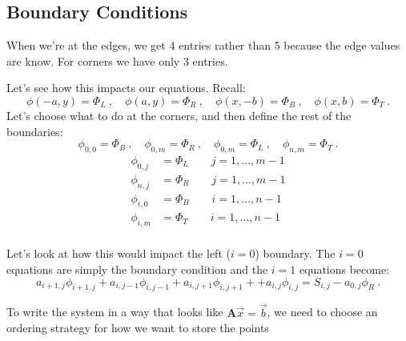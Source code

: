 \documentclass[12pt]{article}
\newcommand{\ve}[1]{\ensuremath{\mathbf{#1}}}
\begin{document}
\subsection{Boundary Conditions}

When we're at the edges, we get 4 entries rather than 5 because the edge values are know. For corners we have only 3 entries. 

Let's see how this impacts our equations. Recall:
%
\[\phi(-a,y) = \Phi_L\:, \quad \phi(a,y) = \Phi_R\:, \quad \phi(x,-b) = \Phi_B\:, \quad \phi(x,b) = \Phi_T\:.\]
%
Let's choose what to do at the corners, and then define the rest of the boundaries:
\[\phi_{0,0} = \Phi_B\:, \quad \phi_{0,m} = \Phi_R\:, \quad \phi_{0,m} = \Phi_L\:, \quad \phi_{n,m} = \Phi_T\:.\]
%
\begin{align}
\phi_{0,j} &= \Phi_L \qquad j=1,\dots,m-1 \nonumber \\
\phi_{n,j} &= \Phi_R \qquad j=1,\dots,m-1 \nonumber \\
\phi_{i,0} &= \Phi_B \qquad i=1,\dots,n-1 \nonumber \\
\phi_{i,m} &= \Phi_T \qquad i=1,\dots,n-1 \nonumber \\
\end{align}

Let's look at how this would impact the left ($i=0$) boundary. The $i=0$ equations are simply the boundary condition and the $i=1$ equations become:
\[a_{i+1,j}\phi_{i+1,j} + a_{i,j-1}\phi_{i,j-1} + a_{i,j+1}\phi_{i,j+1} + + a_{i,j}\phi_{i,j} = S_{i,j} - a_{0,j}\phi_R \:.\]

To write the system in a way that looks like $\ve{A}\vec{x} = \vec{b}$, we need to choose an ordering strategy for how we want to store the points


\begin{minipage}{0.5\textwidth}
\end{minipage} \hfill
\begin{minipage}{0.5\textwidth}
\end{minipage}
\end{document}
